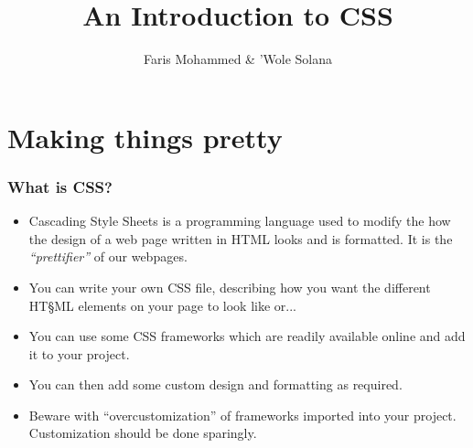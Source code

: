\documentclass[10pt,t,xcolor=dvipsnames]{beamer}
\title{ An Introduction to CSS }
\author{ Faris Mohammed \& 'Wole Solana }
\begin{document}
\nocite*{}
\frame [c, plain]{\titlepage}
\section{Making things pretty}
\begin{frame}
\frametitle{What is CSS?}
\pause
\begin{itemize}[<+->]
\item \alert{C}ascading \alert{S}tyle \alert{S}heets is a programming language used to modify the how the design of a web page written in HTML looks and is formatted. It is the \textit{``prettifier''} of our webpages.
\item You can write your own CSS file, describing how you want the different HT§ML elements on your page to look like or...
\item You can use some CSS frameworks which are readily available online and add it to your project.
\item You can then add some custom design and formatting as required.
\item \alert{Beware} with ``overcustomization'' of frameworks imported into your project. Customization should be done sparingly.
\end{itemize}
\end{frame}
\end{document}
